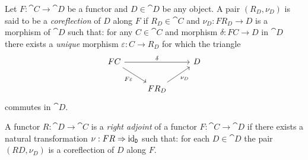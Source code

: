 \begin{definition}[Coreflection]
\label{def:coreflection-along-functor}
Let \(F: \cat C \to \cat D\) be a functor and \(D \in \cat D\) be any object. A pair
\((R_D, \nu_D)\) is said to be a \emph{coreflection} of \(D\) along \(F\) if \(R_D
\in \cat C\) and \(\nu_D: F R_D \to D\) is a morphism of \(\cat D\) such that: for any
\(C \in \cat C\) and morphism \(\delta: F C \to D\) in \(\cat D\) there exists a
\emph{unique} morphism \(\varepsilon: C \to R_D\) for which the triangle
\[
\begin{tikzcd}
F C \ar[rr, "\delta"] \ar[rd, "F \varepsilon"']
& &D
\\
&F R_D
\ar[ru, "\nu_D"']
&
\end{tikzcd}
\]
commutes in \(\cat D\).
\end{definition}

\begin{definition}
\label{def:right-adjoint}
A functor \(R: \cat D \to \cat C\) is a \emph{right adjoint} of a functor
\(F: \cat C \to \cat D\) if there exists a natural transformation
\(\nu: F R \Rightarrow \operatorname{id}_{\texttt D}\) such that: for each \(D \in \cat D\) the pair
\((R D, \nu_D)\) is a coreflection of \(D\) along \(F\).
\end{definition}

